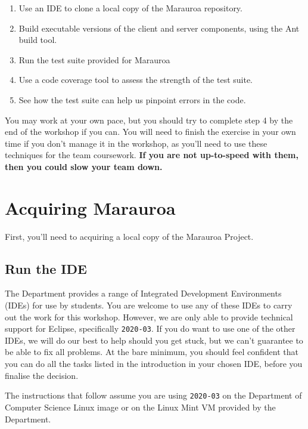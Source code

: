 \documentclass[
]{book}
\providecommand{\tightlist}{%
  \setlength{\itemsep}{0pt}\setlength{\parskip}{0pt}}
\begin{document}
\begin{enumerate}
\def\labelenumi{\arabic{enumi}.}
\tightlist
\item
  Use an IDE to clone a local copy of the Marauroa repository.
\item
  Build executable versions of the client and server components, using the Ant build tool.
\item
  Run the test suite provided for Marauroa
\item
  Use a code coverage tool to assess the strength of the test suite.
\item
  See how the test suite can help us pinpoint errors in the code.
\end{enumerate}

You may work at your own pace, but you should try to complete step 4 by the end of the workshop if you can. You will need to finish the exercise in your own time if you don't manage it in the workshop, as you'll need to use these techniques for the team coursework. \textbf{If you are not up-to-speed with them, then you could slow your team down.}

\hypertarget{acquiring}{%
\section{Acquiring Marauroa}\label{acquiring}}

First, you'll need to acquiring a local copy of the Marauroa Project.

\hypertarget{runide}{%
\subsection{Run the IDE}\label{runide}}

The Department provides a range of Integrated Development Environments (IDEs) for use by students. You are welcome to use any of these IDEs to carry out the work for this workshop. However, we are only able to provide technical support for Eclipse, specifically \texttt{2020-03}. If you do want to use one of the other IDEs, we will do our best to help should you get stuck, but we can't guarantee to be able to fix all problems. At the bare minimum, you should feel confident that you can do all the tasks listed in the introduction in your chosen IDE, before you finalise the decision.

The instructions that follow assume you are using \texttt{2020-03} on the Department of Computer Science Linux image or on the Linux Mint VM provided by the Department.
\end{document}

